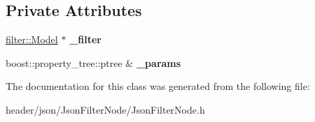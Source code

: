 \subsection*{Private Attributes}
\begin{DoxyCompactItemize}
\item 
\mbox{\label{classjson_1_1_json_filter_node_a82a2c12454ba06b0574c83165399017e}} 
\hyperlink{classfilter_1_1_model}{filter\+::\+Model} $\ast$ {\bfseries \+\_\+filter}
\item 
\mbox{\label{classjson_1_1_json_filter_node_a587e67fff551bff400221ae6fe88b7af}} 
boost\+::property\+\_\+tree\+::ptree \& {\bfseries \+\_\+params}
\end{DoxyCompactItemize}


The documentation for this class was generated from the following file\+:\begin{DoxyCompactItemize}
\item 
header/json/\+Json\+Filter\+Node/Json\+Filter\+Node.\+h\end{DoxyCompactItemize}
